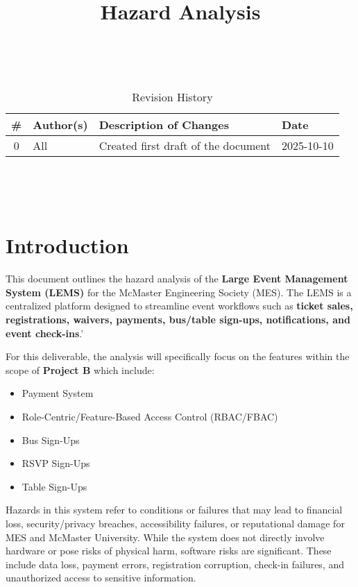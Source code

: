 \documentclass{article}
\title{Hazard Analysis\\\progname}
\author{\authname}
\date{}
\begin{document}
\maketitle
\thispagestyle{empty}

~\newpage


\begin{table}[hp]
\caption{Revision History} \label{TblRevisionHistory}
\begin{tabularx}{\textwidth}{c l X l}
\toprule
\textbf{\#} & \textbf{Author(s)} & \textbf{Description of Changes} & \textbf{Date}\\
\midrule
0 & All & Created first draft of the document & 2025-10-10\\
\bottomrule
\end{tabularx}
\end{table}

~\newpage

\tableofcontents

~\newpage



\section{Introduction}

This document outlines the hazard analysis of the \textbf{Large Event Management System (LEMS)} for the McMaster
Engineering Society (MES). The LEMS is a centralized platform designed to streamline event workflows such as
 \textbf{ticket sales, registrations, waivers, payments, bus/table sign-ups, notifications, and event check-ins}.'
\newline

\noindent
For this deliverable, the analysis will specifically focus on the features within the scope of \textbf{Project B} which include:

\begin{itemize}
    \item Payment System
    \item Role-Centric/Feature-Based Access Control (RBAC/FBAC)
    \item Bus Sign-Ups
    \item RSVP Sign-Ups
    \item Table Sign-Ups
\end{itemize}

\noindent
Hazards in this system refer to conditions or failures that may lead to financial loss, security/privacy breaches,
accessibility failures, or reputational damage for MES and McMaster University. While the system does not directly
involve hardware or pose risks of physical harm, software risks are significant. These include data loss, payment
errors, registration corruption, check-in failures, and unauthorized access to sensitive information.
\newline
\end{document}
